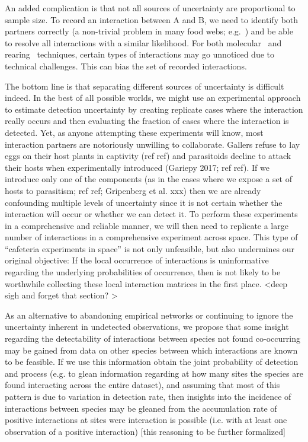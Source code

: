 \documentclass[12pt]{article}
\begin{document}
  An added complication is that not all sources of uncertainty are proportional to sample size. To record an interaction between A and B, we need to identify both partners correctly (a non-trivial problem in many food webs; e.g.~\citet{Kaartinen2011,Roslin2016}) and be able to resolve all interactions with a similar likelihood. For both molecular~\citep{} and rearing~\citep{} techniques, certain types of interactions may go unnoticed due to technical challenges. This can bias the set of recorded interactions.


  The bottom line is that separating different sources of uncertainty is difficult indeed. In the best of all possible worlds, we might use an experimental approach to estimate detection uncertainty by creating replicate cases where the interaction really occurs and then evaluating the fraction of cases where the interaction is detected. Yet, as anyone attempting these experiments will know, most interaction partners are notoriously unwilling to collaborate. Gallers refuse to lay eggs on their host plants in captivity (ref ref) and parasitoids decline to attack their hosts when experimentally introduced (Gariepy 2017; ref ref). If we introduce only one of the components (as in the cases where we expose a set of hosts to parasitism; ref ref; Gripenberg et al. xxx) then we are already confounding multiple levels of uncertainty since it is not certain whether the interaction will occur or whether we can detect it. To perform these experiments in a comprehensive and reliable manner, we will then need to replicate a large number of interactions in a comprehensive experiment across space. This type of “cafeteria experiments in space” is not only unfeasible, but also undermines our original objective: If the local occurrence of interactions is uninformative regarding the underlying probabilities of occurrence, then is not likely to be worthwhile collecting these local interaction matrices in the first place. <deep sigh and forget that section? > 


  As an alternative to abandoning empirical networks or continuing to ignore the uncertainty inherent in undetected observations, we propose that some insight regarding the detectability of interactions between species not found co-occurring may be gained from data on other species between which interactions are known to be feasible. If we use this information obtain the joint probability of detection and process (e.g. to glean information regarding at how many sites the species are found interacting across the entire dataset), and assuming that most of this pattern is due to variation in detection rate, then insights into the incidence of interactions between species may be gleaned from the accumulation rate of positive interactions at sites were interaction is possible (i.e. with at least one observation of a positive interaction) [this reasoning to be further formalized]
\end{document}
